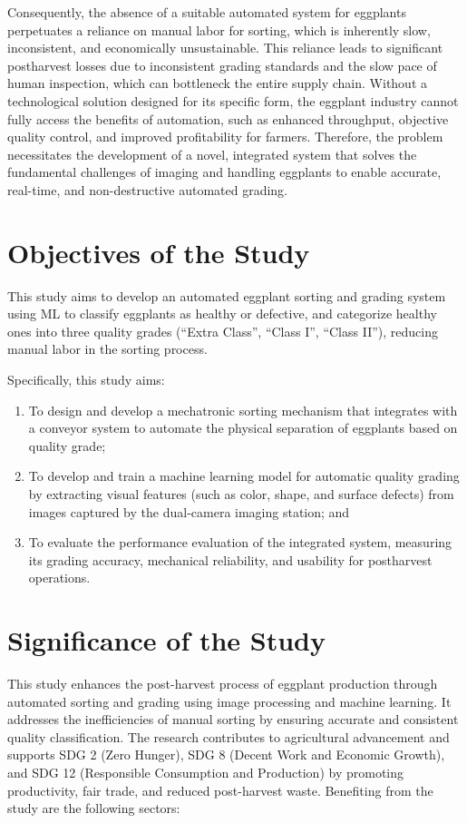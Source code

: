 {Consequently, the absence of a suitable automated system for eggplants perpetuates a reliance on manual labor for sorting, which is inherently slow, inconsistent, and economically unsustainable. This reliance leads to significant postharvest losses due to inconsistent grading standards and the slow pace of human inspection, which can bottleneck the entire supply chain. Without a technological solution designed for its specific form, the eggplant industry cannot fully access the benefits of automation, such as enhanced throughput, objective quality control, and improved profitability for farmers. Therefore, the problem necessitates the development of a novel, integrated system that solves the fundamental challenges of imaging and handling eggplants to enable accurate, real-time, and non-destructive automated grading.


\section{Objectives of the Study}

This study aims to develop an automated eggplant sorting and grading system using ML to classify eggplants as healthy or defective, and categorize healthy ones into three quality grades (“Extra Class”, “Class I”, “Class II”), reducing manual labor in the sorting process.

Specifically, this study aims:
\begin{enumerate}
	\item To design and develop a mechatronic sorting mechanism that integrates with a conveyor system to automate the physical separation of eggplants based on quality grade;
	\item To develop and train a machine learning model for automatic quality grading by extracting visual features (such as color, shape, and surface defects) from images captured by the dual-camera imaging station; and
	\item To evaluate the performance evaluation of the integrated system, measuring its grading accuracy, mechanical reliability, and usability for postharvest operations.
\end{enumerate}

\section{Significance of the Study}

This study enhances the post-harvest process of eggplant production through automated sorting and grading using image processing and machine learning. It addresses the inefficiencies of manual sorting by ensuring accurate and consistent quality classification. The research contributes to agricultural advancement and supports SDG 2 (Zero Hunger), SDG 8 (Decent Work and Economic Growth), and SDG 12 (Responsible Consumption and Production) by promoting productivity, fair trade, and reduced post-harvest waste. Benefiting from the study are the following sectors:

}
